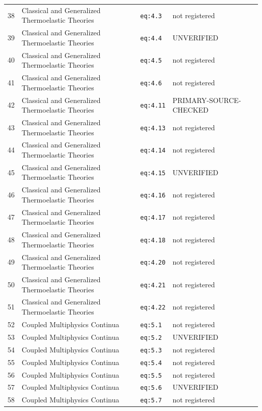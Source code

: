\begin{longtable}{@{}p{1.1cm}p{5.6cm}p{3.4cm}p{2.9cm}@{}}
38 & Classical and Generalized Thermoelastic Theories & \texttt{eq:4.3} & not registered \\
39 & Classical and Generalized Thermoelastic Theories & \texttt{eq:4.4} & UNVERIFIED \\
40 & Classical and Generalized Thermoelastic Theories & \texttt{eq:4.5} & not registered \\
41 & Classical and Generalized Thermoelastic Theories & \texttt{eq:4.6} & not registered \\
42 & Classical and Generalized Thermoelastic Theories & \texttt{eq:4.11} & PRIMARY-SOURCE-CHECKED \\
43 & Classical and Generalized Thermoelastic Theories & \texttt{eq:4.13} & not registered \\
44 & Classical and Generalized Thermoelastic Theories & \texttt{eq:4.14} & not registered \\
45 & Classical and Generalized Thermoelastic Theories & \texttt{eq:4.15} & UNVERIFIED \\
46 & Classical and Generalized Thermoelastic Theories & \texttt{eq:4.16} & not registered \\
47 & Classical and Generalized Thermoelastic Theories & \texttt{eq:4.17} & not registered \\
48 & Classical and Generalized Thermoelastic Theories & \texttt{eq:4.18} & not registered \\
49 & Classical and Generalized Thermoelastic Theories & \texttt{eq:4.20} & not registered \\
50 & Classical and Generalized Thermoelastic Theories & \texttt{eq:4.21} & not registered \\
51 & Classical and Generalized Thermoelastic Theories & \texttt{eq:4.22} & not registered \\
52 & Coupled Multiphysics Continua & \texttt{eq:5.1} & not registered \\
53 & Coupled Multiphysics Continua & \texttt{eq:5.2} & UNVERIFIED \\
54 & Coupled Multiphysics Continua & \texttt{eq:5.3} & not registered \\
55 & Coupled Multiphysics Continua & \texttt{eq:5.4} & not registered \\
56 & Coupled Multiphysics Continua & \texttt{eq:5.5} & not registered \\
57 & Coupled Multiphysics Continua & \texttt{eq:5.6} & UNVERIFIED \\
58 & Coupled Multiphysics Continua & \texttt{eq:5.7} & not registered \\

\end{longtable}
